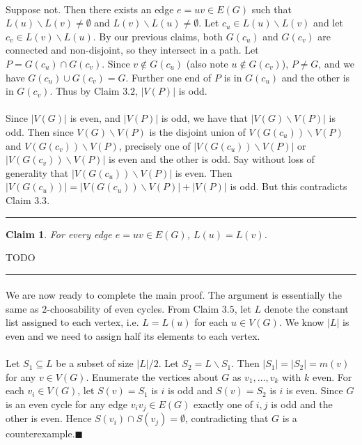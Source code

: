\documentclass[letterpaper,12pt,oneside,onecolumn]{article}
\newenvironment{proof}{{\bf Proof:  }}{\hfill\rule{2mm}{2mm}}
\newtheorem{claim}[fact]{Claim}
\begin{document}
\begin{proof}
	\paragraph{}
	Suppose not. Then there exists an edge $e=uv \in E(G)$ such that $L(u)\backslash L(v) \neq \emptyset$ and $L(v)\backslash L(u) \neq \emptyset$. Let $c_u \in L(u) \backslash L(v)$ and let $c_v \in L(v)\backslash L(u)$. By our previous claims, both $G(c_u)$ and $G(c_v)$ are connected and non-disjoint, so they intersect in a path. Let $P = G(c_u) \cap G(c_v)$. Since $v \not\in G(c_u)$ (also note $u \not\in G(c_v)$), $P \neq G$, and we have $G(c_u) \cup G(c_v) = G$. Further one end of $P$ is in $G(c_u)$ and the other is in $G(c_v)$. Thus by Claim $3.2$, $|V(P)|$ is odd.
	\paragraph{}
	Since $|V(G)|$ is even,  and $|V(P)|$ is odd, we have that $|V(G) \backslash V(P)|$ is odd. Then since $V(G)\backslash V(P)$ is the disjoint union of $V(G(c_u))\backslash V(P)$ and $V(G(c_v)) \backslash V(P)$, precisely one of $|V(G(c_u))\backslash V(P)|$ or $|V(G(c_v))\backslash V(P)|$ is even and the other is odd. Say without loss of generality that $|V(G(c_u))\backslash V(P)|$ is even. Then $|V(G(c_u))| = |V(G(c_u))\backslash V(P)| + |V(P)|$ is odd. But this contradicts Claim $3.3$.
	\end{proof}
\begin{claim}
For every edge $e=uv \in E(G)$, $L(u) = L(v)$.
\end{claim}
\begin{proof}
	TODO
\end{proof}
\paragraph{}
We are now ready to complete the main proof. The argument is essentially the same as $2$-choosability of even cycles. From Claim $3.5$, let $L$ denote the constant list assigned to each vertex, i.e. $L = L(u)$ for each $u \in V(G)$. We know $|L|$ is even and we need to assign half its elements to each vertex.
\paragraph{}
 Let $S_1 \subseteq L$ be a subset of size $|L|/2$. Let $S_2 = L \backslash S_1$. Then $|S_1| = |S_2| = m(v)$ for any $v \in V(G)$. Enumerate the vertices about $G$ as $v_1, \dots, v_k$ with $k$ even. For each $v_i \in V(G)$, let $S(v) = S_1$ is $i$ is odd and $S(v) = S_2$ is $i$ is even. Since $G$ is an even cycle for any edge $v_iv_j \in E(G)$ exactly one of $i,j$ is odd and the other is even. Hence $S(v_i) \cap S(v_j) = \emptyset$, contradicting that $G$ is a counterexample.$\blacksquare$

\newpage
\section{}
\end{document}
